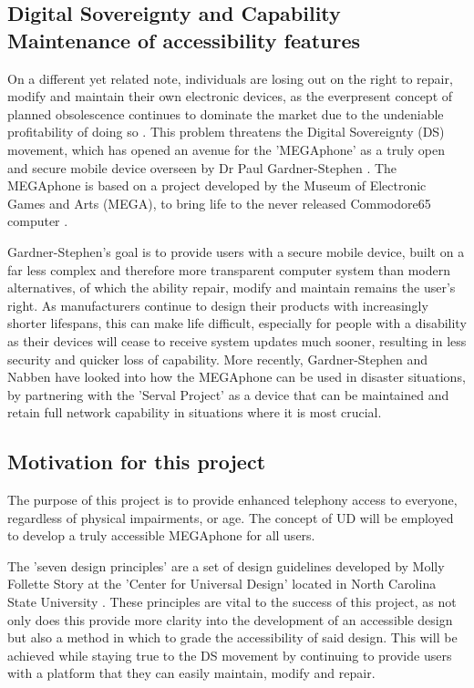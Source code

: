 \subsection{Digital Sovereignty and Capability Maintenance of accessibility features} %
On a different yet related note, individuals are losing out on the right to repair, modify and maintain their own electronic devices, as the everpresent concept of planned obsolescence continues to dominate the market due to the undeniable profitability of doing so \cite{obsolescence2}.
This problem threatens the Digital Sovereignty (DS) movement, which has opened an avenue for the 'MEGAphone' as a truly open and secure mobile device overseen by Dr Paul Gardner-Stephen \cite{mobilehistory}.
The MEGAphone is based on a project developed by the Museum of Electronic Games and Arts (MEGA), to bring life to the never released Commodore65 computer \cite{mega65}.

Gardner-Stephen's goal is to provide users with a secure mobile device, built on a far less complex and therefore more transparent computer system than modern alternatives, of which the ability repair, modify and maintain remains the user's right.
As manufacturers continue to design their products with increasingly shorter lifespans, this can make life difficult, especially for people with a disability as their devices will cease to receive system updates much sooner, resulting in less security and quicker loss of capability.
More recently, Gardner-Stephen and Nabben \cite{capability} have looked into how the MEGAphone can be used in disaster situations, by partnering with the 'Serval Project' \cite{serval} as a device that can be maintained and retain full network capability in situations where it is most crucial.

\subsection{Motivation for this project} \label{Motivation}
The purpose of this project is to provide enhanced telephony access to everyone, regardless of physical impairments, or age.
The concept of UD will be employed to develop a truly accessible MEGAphone for all users.

The 'seven design principles' are a set of design guidelines developed by Molly Follette Story at the 'Center for Universal Design' located in North Carolina State University \cite{sevenprinciples}.
These principles are vital to the success of this project, as not only does this provide more clarity into the development of an accessible design but also a method in which to grade the accessibility of said design.
This will be achieved while staying true to the DS movement by continuing to provide users with a platform that they can easily maintain, modify and repair.

